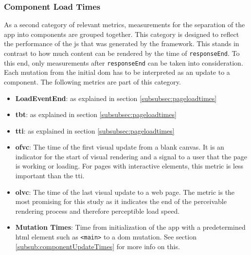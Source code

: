 \documentclass[a4paper, 12pt]{article}
\begin{document}
\subsubsection{Component Load Times}\label{subsubsec:componentloadtimes}
% 

As a second category of relevant metrics, measurements for the separation of the app into components are grouped together.
This category is designed to reflect the performance of the \acrlong{js} that was generated by the framework.
This stands in contrast to how much content can be rendered by the time of \verb|responseEnd|.
To this end, only measurements after \verb|responseEnd| can be taken into consideration.
Each mutation from the initial \acrshort{dom} has to be interpreted as an update to a component.
The following metrics are part of this category.

\begin{itemize}
  \item \textbf{LoadEventEnd}: as explained in section \ref{subsubsec:pageloadtimes}
  \item \textbf{\acrfull{tbt}}: as explained in section \ref{subsubsec:pageloadtimes}
  \item \textbf{\acrfull{tti}}: as explained in section \ref{subsubsec:pageloadtimes}
  \item \textbf{\acrfull{ofvc}}: The time of the first visual update from a blank canvas.
  It is an indicator for the start of visual rendering and a signal to a user that the page is working or loading.
  For pages with interactive elements, this metric is less important than the \acrshort{tti}.
  \item \textbf{\acrfull{olvc}}: The time of the last visual update to a web page.
  The metric is the most promising for this study as it indicates the end of the perceivable rendering process and therefore perceptible load speed.
  \item \textbf{Mutation Times}: Time from initialization of the app with a predetermined \acrshort{html} element such as \verb|<main>| to a \acrshort{dom} mutation.
  See section \ref{subsub:componentUpdateTimes} for more info on this.
\end{itemize}
\end{document}
